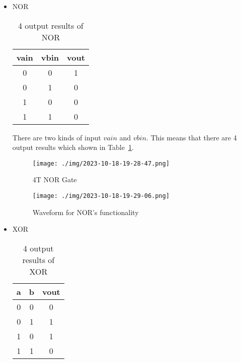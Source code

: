 \documentclass{article}
\begin{document}
\begin{itemize}
            \item NOR
            
\begin{table}[H]
    \caption{4 output results of NOR}
    \centering\large
    \begin{tabular}{|c|c|c|}
        \hline
        \textbf{vain} & \textbf{vbin} & \textbf{vout}  \\
        \hline
        0 & 0 & 1\\
        \hline
        0 & 1 & 0\\
        \hline
        1 & 0 & 0\\
        \hline
        1 & 1 & 0 \\ \hline
    \end{tabular}
    \label{NOR}
\end{table}

There are two kinds of input $vain$ and $vbin$. This means that there are 4 output results which shown in Table~\ref{NOR}.
            
\begin{figure}[H]
    \centering
    \begin{minipage}[t]{0.3\textwidth}
    \centering
        \texttt{[image: ./img/2023-10-18-19-28-47.png]}
    \caption{4T NOR Gate}
    \label{nor1}
    \end{minipage}
    \qquad
    \begin{minipage}[t]{0.6\textwidth}
    \centering
        \texttt{[image: ./img/2023-10-18-19-29-06.png]}
    \caption{Waveform for NOR's functionality}
    \label{nor2}
    \end{minipage}
\end{figure}


            \item XOR
\begin{table}[H]
    \centering\large
    \caption{4 output results of XOR}
    \begin{tabular}{|c|c|c|}
        \hline
        \textbf{a} & \textbf{b} & \textbf{vout}  \\
        \hline
        0 & 0 & 0\\
        \hline
        0 & 1 & 1\\
        \hline
        1 & 0 & 1\\
        \hline
        1 & 1 & 0 \\ \hline
    \end{tabular}
    \label{XOR}
\end{table}


\end{itemize}
\end{document}
